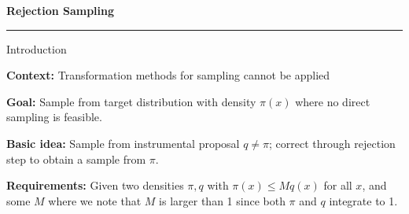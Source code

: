 \begin{frame}
	\vspace{2cm}
	\begin{center}
		{\Huge\textbf{\textcolor{copenhagenred}{Rejection Sampling}}}
		\vspace{1cm}

		\rule{4cm}{3pt}
		\vspace{2cm}
	\end{center}
\end{frame}

\begin{frame}{Introduction}

	\textbf{Context:} Transformation methods for sampling cannot be applied

	\vspace{0.5cm}
	\textbf{Goal:} Sample from target distribution with density $\pi(x)$ where no direct
	sampling is feasible.

	\vspace{0.5cm}
	\textbf{Basic idea:} Sample from instrumental proposal $q \neq \pi$; correct
	through rejection step to obtain a sample from $\pi$.

	\vspace{0.5cm}
	\textbf{Requirements:} Given two densities $\pi,q$ with $\pi ( x ) \leq M q ( x )$ 
	for all $x$, and some $M$ where we note that $M$ is larger than 1 since 
	both $\pi$ and $q$ integrate to 1.
\end{frame}

